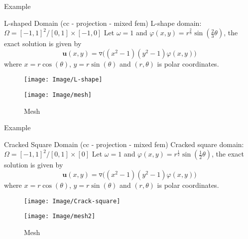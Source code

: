 \documentclass[13pt]{beamer}
\begin{document}
\begin{frame}[t]{Example}
   \begin{block}{L-shaped Domain (cc - projection - mixed fem)}
     L-shape domain: $\Omega = [-1,1]^2/[0,1]\times[-1,0]$
     Let $\omega = 1$ and $\varphi(x,y) = r^{\frac{2}{3}}\sin(\frac{2}{3}\theta)$, the exact solution is given by\\[-2ex]
     \[\mathbf{u}(x,y) = \triangledown\big((x^2 - 1)(y^2 - 1)\varphi(x,y)\big)\]
     where $x = r\cos(\theta)$, $y = r\sin(\theta)$ and $(r,\theta)$ is  polar coordinates. \\[-1ex]       
     \begin{figure}[bhpt]
         \hspace{-1.pt}
         \begin{minipage}[b]{0.5 \textwidth}
          \centering
          \texttt{[image: Image/L-shape]}\\
          \caption{L-shape domain}\label{fig:L-shape}
        \end{minipage}
        \hspace{-1.in}
        \begin{minipage}[b]{0.5 \textwidth}
          \centering
          \texttt{[image: Image/mesh]}\\
          \caption{Mesh}\label{fig:mesh}
        \end{minipage}
     \end{figure}
   \end{block}
\end{frame}

\begin{frame}[t]{Example}
   \begin{block}{Cracked Square Domain (cc - projection - mixed fem)}
     Cracked square domain: $\Omega = [-1,1]^2/[0,1]\times[0]$
     Let $\omega = 1$ and $\varphi(x,y) = r^{\frac{1}{2}}\sin(\frac{1}{2}\theta)$, the exact solution is given by\\[-2ex]
     \[\mathbf{u}(x,y) = \triangledown\big((x^2 - 1)(y^2 - 1)\varphi(x,y)\big)\]
     where $x = r\cos(\theta)$, $y = r\sin(\theta)$ and $(r,\theta)$ is  polar coordinates. \\[-1ex]
     \begin{figure}[bhpt]
         \hspace{-1.pt}
         \begin{minipage}[b]{0.5 \textwidth}
          \centering
          \texttt{[image: Image/Crack-square]}\\
          \caption{Cracked square domain}\label{fig:L-shape}
        \end{minipage}
        \hspace{-0.6in}
        \begin{minipage}[b]{0.5 \textwidth}
          \centering
          \texttt{[image: Image/mesh2]}\\
          \caption{Mesh}\label{fig:mesh2}
        \end{minipage}
     \end{figure}
   \end{block}
\end{frame}
\end{document}
